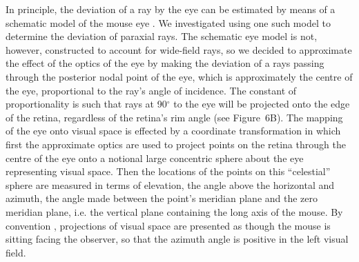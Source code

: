 \documentclass[10pt]{article}
\newcounter{Figure}
\begin{document}
In principle, the deviation of a ray by the eye can be estimated by
means of a schematic model of the mouse eye \cite{RemtullaHallett1985,SchmuckerSchaeffel2004}. We investigated using one such
model \cite{SchmuckerSchaeffel2004} to determine the deviation of
paraxial rays. The schematic eye model is not, however, constructed
to account for wide-field rays, so we decided to approximate the
effect of the optics of the eye by making the deviation of a rays
passing through the posterior nodal point of the eye, which is
approximately the centre of the eye, proportional to the ray's angle
of incidence. The constant of proportionality is such that rays at
90$^{\circ}$ to the eye will be projected onto the edge of the retina,
regardless of the retina's rim angle (see Figure~6B).  The mapping of
the eye onto visual space is effected by a coordinate transformation
in which first the approximate optics are used to project points on
the retina through the centre of the eye onto a notional large
concentric sphere about the eye representing visual space. Then the
locations of the points on this ``celestial'' sphere are measured in
terms of elevation, the angle above the horizontal and azimuth, the
angle made between the point's meridian plane and the zero meridian
plane, i.e. the vertical plane containing the long axis of the mouse.
By convention \cite{DragerOlsen1980,ColemanEtal2009,Drager1978}, projections of visual space are presented as though the mouse
is sitting facing the observer, so that the azimuth angle is positive
in the left visual field. 
\end{document}
